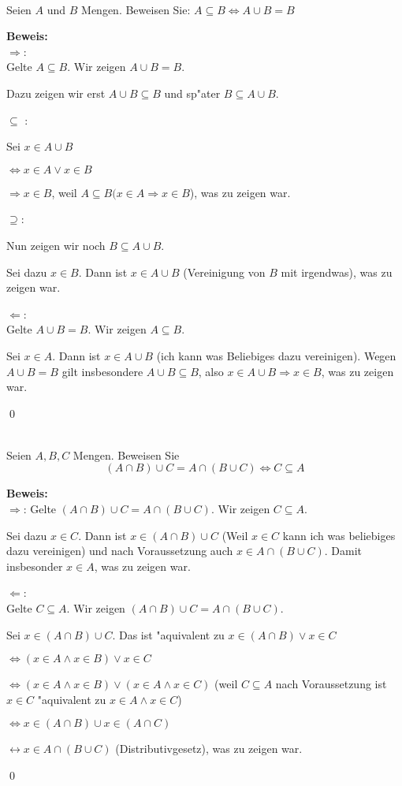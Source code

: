 \\
Seien $A$ und $B$ Mengen. Beweisen Sie:
$A\subseteq B\Leftrightarrow A\cup B=B$

\begin{loesung}
\textbf{Beweis:}\\
\glqq $\Rightarrow$\grqq :\\
Gelte $A\subseteq B$. Wir zeigen $A\cup B=B$.

Dazu zeigen wir erst $A\cup B\subseteq B$ und sp"ater $B\subseteq A\cup B$.

\glqq $\subseteq$ \grqq:

Sei $x\in A\cup B$

$\Leftrightarrow x\in A\vee x\in B$

$\Rightarrow x\in B$, weil $A\subseteq B (x\in A\Rightarrow x\in B$), was zu zeigen war.

\glqq$\supseteq$\grqq:

Nun zeigen wir noch $B\subseteq A\cup B$. 

Sei dazu $x\in B$. Dann ist $x\in A\cup B$ (Vereinigung von $B$ mit irgendwas), was zu zeigen war.

\glqq$\Leftarrow$\grqq:\\
Gelte $A\cup B=B$. Wir zeigen $A\subseteq B$.

Sei $x\in A$. Dann ist $x\in A\cup B$ (ich kann was Beliebiges dazu vereinigen). Wegen $A\cup B=B$ gilt insbesondere $A\cup B\subseteq B$, also $x\in A\cup B\Rightarrow x\in B$, was zu zeigen war.

\qed

\end{loesung}


\\
Seien $A,B,C$ Mengen. Beweisen Sie \[(A\cap B)\cup C=A\cap (B\cup C)\Leftrightarrow C\subseteq A\]

\begin{loesung}
  \textbf{Beweis:}\\
\glqq $\Rightarrow$\grqq: Gelte $(A\cap B)\cup C=A\cap(B\cup C)$. Wir zeigen $C\subseteq A$.

Sei dazu $x\in C$. Dann ist $x\in (A\cap B)\cup C$ (Weil $x\in C$ kann ich was beliebiges dazu vereinigen) und nach Voraussetzung auch 
$x\in A\cap (B\cup C)$. Damit insbesonder $x\in A$, was zu zeigen war.

\glqq $\Leftarrow$\grqq:\\
Gelte $C\subseteq A$. Wir zeigen $(A\cap B)\cup C=A\cap(B\cup C)$.

Sei $x\in (A\cap B)\cup C$. Das ist "aquivalent zu $x\in (A\cap B)\vee x\in C$

$\Leftrightarrow (x\in A\wedge x\in B)\vee x\in C$

$\Leftrightarrow (x\in A\wedge x\in B)\vee (x\in A\wedge x\in C)$ (weil $C\subseteq A$ nach Voraussetzung ist $x\in C$ "aquivalent zu $x\in A\wedge x\in C$)

$\Leftrightarrow x\in (A\cap B)\cup x\in (A\cap C)$

$\leftrightarrow x\in A\cap(B\cup C)$ (Distributivgesetz), was zu zeigen war.

\qed

\end{loesung}

